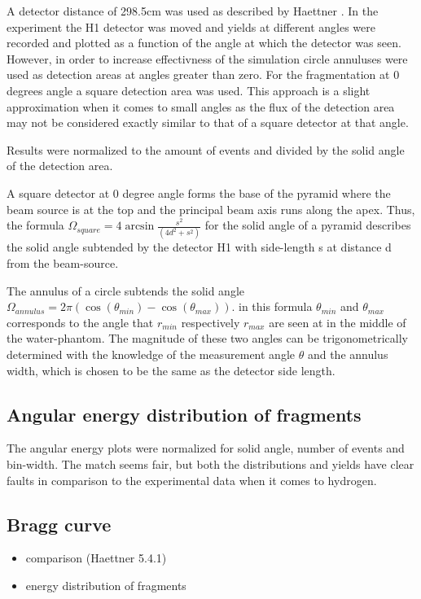 A detector distance of 298.5cm was used as described by Haettner \cite[fig 5.1]{ehaettner} . In the experiment the H1 detector was moved and yields at different angles were recorded and plotted as a function of the angle at which the detector was seen. However, in order to increase effectivness of the simulation circle annuluses were used as detection areas at angles greater than zero. For the fragmentation at 0 degrees angle a square detection area was used. This approach is a slight approximation when it comes to small angles as the flux of the detection area may not be considered exactly similar to that of a square detector at that angle.

Results were normalized to the amount of events and divided by the solid angle of the detection area.

A square detector at 0 degree angle forms the base of the pyramid where the beam source is at the top and the principal beam axis runs along the apex. Thus, the formula $\Omega_{square} = 4 \arcsin{\frac{s^2}{(4d^2+s^2)}}$ for the solid angle of a pyramid describes the solid angle subtended by the detector H1 with side-length s at distance d from the beam-source.

The annulus of a circle subtends the solid angle $\Omega_{annulus} = 2 \pi (\cos(\theta_{min}) - \cos(\theta_{max}))$. in this formula $\theta_{min}$ and $\theta_{max}$ corresponds to the angle that $r_{min}$ respectively $r_{max}$ are seen at in the middle of the water-phantom. The magnitude of these two angles can be trigonometrically determined with the knowledge of the measurement angle $\theta$ and the annulus width, which is chosen to be the same as the detector side length.

\subsection{Angular energy distribution of fragments}

The angular energy plots were normalized for solid angle, number of events and bin-width. The match seems fair, but both the distributions and yields have clear faults in comparison to the experimental data when it comes to hydrogen.

\subsection{Bragg curve}


\begin{itemize}
\item comparison (Haettner 5.4.1)
\item energy distribution of fragments
\end{itemize}

